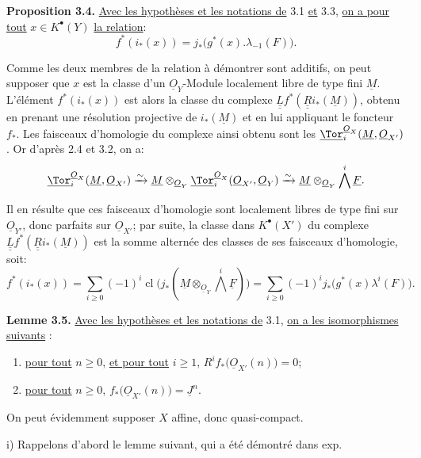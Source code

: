 
\textbf{Proposition 3.4.} \uline{Avec les hypothèses et les notations de} 3.1 \uline{et} 3.3, \uline{on a pour tout} \(x\in K^{\bullet}(Y)\) \uline{la relation}:
\[
f^*(i_*(x))=j_*\bigl(g^*(x).\lambda_{-1}(F)\bigr).
\]

Comme les deux membres de la relation à démontrer sont additifs, on peut supposer que \(x\) est la classe d'un \(\underline{O}_Y\)-Module localement libre de type fini \(\underline{M}\). L'élément \(f^*(i_*(x))\) est alors la classe du complexe \(\underline{\underline{L}}f^*(\underline{\underline{R}}i_*(\underline{M}))\), obtenu en prenant une résolution projective de \(i_*(\underline{M})\) et en lui appliquant le foncteur \(f_*\). Les faisceaux d'homologie du complexe ainsi obtenu sont les \(\underline{\Tor}_i^{\underline{O}_X}(\underline{M},\underline{O}_{X'})\). Or d'après 2.4 et 3.2, on a:
\[
\underline{\Tor}_i^{\underline{O}_X}(\underline{M},\underline{O}_{X'})
\xrightarrow{\sim}
\underline{M}\otimes_{\underline{O}_Y}\underline{\Tor}_i^{\underline{O}_X}(\underline{O}_{X'},\underline{O}_Y)
\xrightarrow{\sim}
\underline{M}\otimes_{\underline{O}_Y}\bigwedge^i\underline{F}.
\]

Il en résulte que ces faisceaux d'homologie sont localement libres de type fini sur \(\underline{O}_{Y'}\), donc parfaits sur \(\underline{O}_{X'}\); par suite, la classe dans \(K^{\bullet}(X')\) du complexe \(\underline{\underline{L}}f^*(\underline{\underline{R}}i_*(\underline{M}))\) est la somme alternée des classes de ses faisceaux d'homologie, soit:
\[
f^*(i_*(x))
=\sum_{i\ge0}(-1)^i\operatorname{cl}
\bigl(j_*(\underline{M}\otimes_{\underline{O}_Y}\bigwedge^i\underline{F})\bigr)
=\sum_{i\ge0}(-1)^i
j_*\bigl(g^*(x)\lambda^i(F)\bigr).
\]

\textbf{Lemme 3.5.} \uline{Avec les hypothèses et les notations de} 3.1, \uline{on a les isomorphismes suivants} :
\begin{enumerate}[label=\roman*)]
\item \uline{pour tout} \(n\ge0\), \uline{et pour tout} \(i\ge1\), \(R^if_*\bigl(\underline{O}_{X'}(n)\bigr)=0\);
\item \uline{pour tout} \(n\ge0\), \(f_*\bigl(\underline{O}_{X'}(n)\bigr)=\underline{J}^n\).
\end{enumerate}

On peut évidemment supposer \(X\) affine, donc quasi-compact.

i) Rappelons d'abord le lemme suivant, qui a été démontré dans exp.

